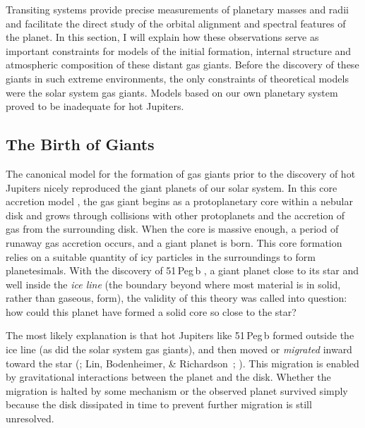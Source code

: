 Transiting systems provide precise measurements of planetary masses and radii and facilitate the direct study of the orbital alignment and spectral features of the planet.
In this section, I will explain how these observations serve as important constraints for models of the initial formation, internal structure and atmospheric composition of these distant gas giants.
Before the discovery of these giants in such extreme environments, the only constraints of theoretical models were the solar system gas giants.
Models based on our own planetary system proved to be inadequate for hot Jupiters.

\subsection{The Birth of Giants}
\label{cha:intro:sec:form:subsec:birth}

The canonical model for the formation of gas giants prior to the discovery of hot Jupiters nicely reproduced the giant planets of our solar system.
In this core accretion model \citep[see, e.g.,][]{Pollack:araa:1984a,Pollack_Hubickyj_Bodenheimer:icarus:1996a}, the gas giant begins as a protoplanetary core within a nebular disk and grows through collisions with other protoplanets and the accretion of gas from the surrounding disk.
When the core is massive enough, a period of runaway gas accretion occurs, and a giant planet is born.
This core formation relies on a suitable quantity of icy particles in the surroundings to form planetesimals.
With the discovery of \mbox{51\,Peg\,b} \citep{Mayor_Queloz:nat:1995a}, a giant planet close to its star and well inside the {\it ice line} (the boundary beyond where most material is in solid, rather than gaseous, form), the validity of this theory was called into question: how could this planet have formed a solid core so close to the star?

The most likely explanation is that hot Jupiters like \mbox{51\,Peg\,b} formed outside the ice line (as did the solar system gas giants), and then moved or {\it migrated} inward toward the star (\citealp{Goldreich_Tremaine:apj:1980a}; Lin, Bodenheimer, \& Richardson~\citeyear{Lin_Bodenheimer_Richardson:nat:1996a}; \citealp{Trilling_Benz_Guillot:apj:1998a}).
This migration is enabled by gravitational interactions between the planet and the disk.
Whether the migration is halted by some mechanism or the observed planet survived simply because the disk dissipated in time to prevent further migration is still unresolved.

